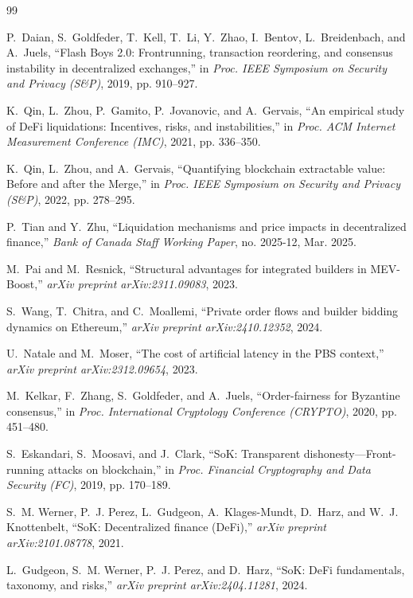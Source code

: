 
\begin{thebibliography}{99}

P.~Daian, S.~Goldfeder, T.~Kell, T.~Li, Y.~Zhao, I.~Bentov, L.~Breidenbach, and A.~Juels,
``Flash Boys 2.0: Frontrunning, transaction reordering, and consensus instability in decentralized exchanges,''
in \emph{Proc. IEEE Symposium on Security and Privacy (S\&P)}, 2019, pp. 910--927.

K.~Qin, L.~Zhou, P.~Gamito, P.~Jovanovic, and A.~Gervais,
``An empirical study of DeFi liquidations: Incentives, risks, and instabilities,''
in \emph{Proc. ACM Internet Measurement Conference (IMC)}, 2021, pp. 336--350.

K.~Qin, L.~Zhou, and A.~Gervais,
``Quantifying blockchain extractable value: Before and after the Merge,''
in \emph{Proc. IEEE Symposium on Security and Privacy (S\&P)}, 2022, pp. 278--295.

P.~Tian and Y.~Zhu,
``Liquidation mechanisms and price impacts in decentralized finance,''
\emph{Bank of Canada Staff Working Paper}, no. 2025-12, Mar. 2025.

M.~Pai and M.~Resnick,
``Structural advantages for integrated builders in MEV-Boost,''
\emph{arXiv preprint arXiv:2311.09083}, 2023.

S.~Wang, T.~Chitra, and C.~Moallemi,
``Private order flows and builder bidding dynamics on Ethereum,''
\emph{arXiv preprint arXiv:2410.12352}, 2024.

U.~Natale and M.~Moser,
``The cost of artificial latency in the PBS context,''
\emph{arXiv preprint arXiv:2312.09654}, 2023.

M.~Kelkar, F.~Zhang, S.~Goldfeder, and A.~Juels,
``Order-fairness for Byzantine consensus,''
in \emph{Proc. International Cryptology Conference (CRYPTO)}, 2020, pp. 451--480.

S.~Eskandari, S.~Moosavi, and J.~Clark,
``SoK: Transparent dishonesty---Front-running attacks on blockchain,''
in \emph{Proc. Financial Cryptography and Data Security (FC)}, 2019, pp. 170--189.

S.~M. Werner, P.~J. Perez, L.~Gudgeon, A.~Klages-Mundt, D.~Harz, and W.~J. Knottenbelt,
``SoK: Decentralized finance (DeFi),''
\emph{arXiv preprint arXiv:2101.08778}, 2021.

L.~Gudgeon, S.~M. Werner, P.~J. Perez, and D.~Harz,
``SoK: DeFi fundamentals, taxonomy, and risks,''
\emph{arXiv preprint arXiv:2404.11281}, 2024.

\end{thebibliography}
